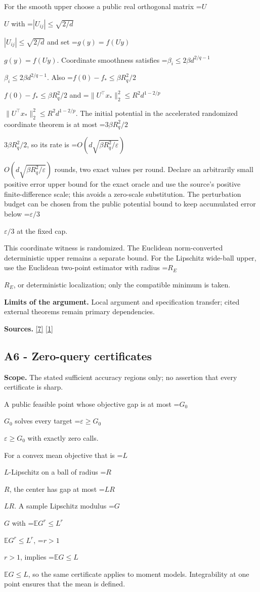 \documentclass[10pt,a4paper]{article}
\newcommand{\AtlasMath}[1]{\par\begingroup\centering\setbox0=\hbox{$\displaystyle #1$}\ifdim\wd0>1.4\linewidth\typeout{ATLAS WIDE FORMULA: \the\wd0}\fi\ifdim\wd0>\linewidth\resizebox{\linewidth}{!}{\box0}\else\box0\fi\par\endgroup}
\newcommand{\AtlasInlineMath}[1]{\begingroup\setbox0=\hbox{$#1$}\ifdim\wd0>.4\linewidth\endgroup\AtlasMath{#1}\else\endgroup$#1$\fi}
\begin{document}
For the smooth upper choose a public real orthogonal matrix \AtlasInlineMath{U} with \AtlasInlineMath{|U_{ij}|\le\sqrt{2/d}} and set \AtlasInlineMath{g(y)=f(Uy)}. Coordinate smoothness satisfies \AtlasInlineMath{\beta_i\le2\beta d^{2/q-1}}. Also \AtlasInlineMath{f(0)-f_*\le\beta R_q^2/2} and \AtlasInlineMath{\|U^\top x_*\|_2^2\le R^2d^{1-2/p}}. The initial potential in the accelerated randomized coordinate theorem is at most \AtlasInlineMath{3\beta R_q^2/2}, so its rate is \AtlasInlineMath{O(d\sqrt{\beta R_q^2/\varepsilon})} rounds, two exact values per round. Declare an arbitrarily small positive error upper bound for the exact oracle and use the source's positive finite-difference scale; this avoids a zero-scale substitution. The perturbation budget can be chosen from the public potential bound to keep accumulated error below \AtlasInlineMath{\varepsilon/3} at the fixed cap.

This coordinate witness is randomized. The Euclidean norm-converted deterministic upper remains a separate bound. For the Lipschitz wide-ball upper, use the Euclidean two-point estimator with radius \AtlasInlineMath{R_E}, or deterministic localization; only the compatible minimum is taken.

\textbf{Limits of the argument.} Local argument and specification transfer; cited external theorems remain primary dependencies.

\textbf{Sources.} \href{https://arxiv.org/pdf/1707.08486v2}{[7]} \href{https://arxiv.org/html/2610.00345v1}{[1]}

\subsection{A6 - Zero-query certificates}
\textbf{Scope.} The stated sufficient accuracy regions only; no assertion that every certificate is sharp.

A public feasible point whose objective gap is at most \AtlasInlineMath{G_0} solves every target \AtlasInlineMath{\varepsilon\ge G_0} with exactly zero calls.

For a convex mean objective that is \AtlasInlineMath{L}-Lipschitz on a ball of radius \AtlasInlineMath{R}, the center has gap at most \AtlasInlineMath{LR}. A sample Lipschitz modulus \AtlasInlineMath{G} with \AtlasInlineMath{\mathbb E G^r\le L^r}, \AtlasInlineMath{r>1}, implies \AtlasInlineMath{\mathbb E G\le L}, so the same certificate applies to moment models. Integrability at one point ensures that the mean is defined.
\end{document}
